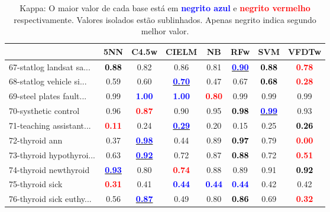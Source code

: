 \begin{table}[h]
\caption{Kappa: O maior valor de cada base está em \textcolor{blue}{\textbf{negrito azul}} e \textcolor{red}{\textbf{negrito vermelho}} respectivamente. Valores isolados estão sublinhados. Apenas negrito indica segundo melhor valor.}
\begin{center}\begin{tabular}{lc|c|c|c|c|c|c}
 & 5NN & C4.5w & CIELM & NB & RFw & SVM & VFDTw\\ \hline 67-statlog landsat sa... & \textcolor{black}{\textbf{  0.88}} &   0.82 &   0.86 &   0.81 & \underline{\textcolor{blue}{\textbf{  0.90}}} & \textcolor{black}{\textbf{  0.88}} & \textcolor{red}{\textbf{  0.78}} \\
68-statlog vehicle si... &   0.59 &   0.60 & \underline{\textcolor{blue}{\textbf{  0.70}}} &   0.47 &   0.67 & \textcolor{black}{\textbf{  0.68}} & \textcolor{red}{\textbf{  0.28}} \\
69-steel plates fault... &   0.99 & \textcolor{blue}{\textbf{  1.00}} & \textcolor{blue}{\textbf{  1.00}} & \textcolor{red}{\textbf{  0.80}} &   0.99 &   0.99 &   0.99 \\
70-systhetic control &   0.96 & \textcolor{red}{\textbf{  0.87}} &   0.90 &   0.95 & \textcolor{black}{\textbf{  0.98}} & \underline{\textcolor{blue}{\textbf{  0.99}}} &   0.93 \\
71-teaching assistant... & \textcolor{red}{\textbf{  0.11}} &   0.24 & \underline{\textcolor{blue}{\textbf{  0.29}}} &   0.20 &   0.15 &   0.25 & \textcolor{black}{\textbf{  0.26}} \\ \hline
72-thyroid ann &   0.37 & \underline{\textcolor{blue}{\textbf{  0.98}}} &   0.44 &   0.89 & \textcolor{black}{\textbf{  0.97}} &   0.79 & \textcolor{red}{\textbf{  0.00}} \\
73-thyroid hypothyroi... &   0.63 & \underline{\textcolor{blue}{\textbf{  0.92}}} &   0.72 &   0.87 & \textcolor{black}{\textbf{  0.88}} &   0.72 & \textcolor{red}{\textbf{  0.51}} \\
74-thyroid newthyroid & \underline{\textcolor{blue}{\textbf{  0.93}}} &   0.80 & \textcolor{red}{\textbf{  0.74}} &   0.88 &   0.89 &   0.91 & \textcolor{black}{\textbf{  0.92}} \\
75-thyroid sick & \textcolor{red}{\textbf{  0.31}} &   0.41 & \textcolor{blue}{\textbf{  0.44}} & \textcolor{blue}{\textbf{  0.44}} & \textcolor{blue}{\textbf{  0.44}} &   0.42 &   0.42 \\
76-thyroid sick euthy... &   0.56 & \underline{\textcolor{blue}{\textbf{  0.87}}} &   0.49 &   0.80 & \textcolor{black}{\textbf{  0.86}} &   0.69 & \textcolor{red}{\textbf{  0.32}} \\ \hline

\end{tabular}
\end{center}
\end{table}
